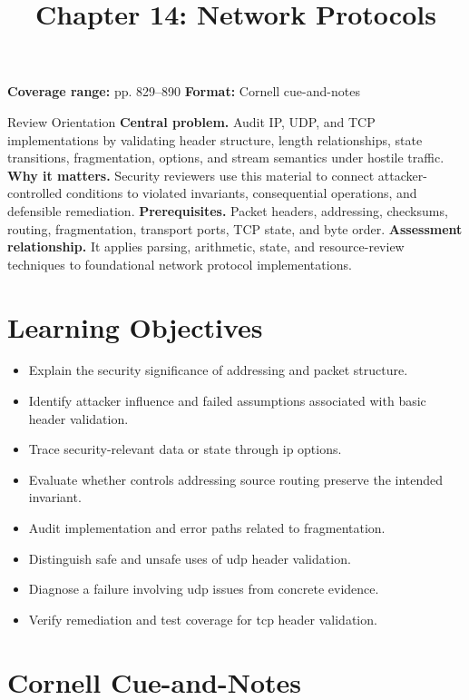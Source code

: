 \documentclass[11pt,letterpaper]{article}
\title{Chapter 14: Network Protocols}
\author{}
\date{}
\begin{document}
\maketitle

\begin{center}
\small\color{Meta}\textbf{Coverage range:} pp. 829--890 \quad\textbullet\quad \textbf{Format:} Cornell cue-and-notes
\end{center}
\vspace{0.25em}
\begin{CornellOverviewBox}{Review Orientation}
\textbf{Central problem.} Audit IP, UDP, and TCP implementations by validating header structure, length relationships, state transitions, fragmentation, options, and stream semantics under hostile traffic.
\textbf{Why it matters.} Security reviewers use this material to connect attacker-controlled conditions to violated invariants, consequential operations, and defensible remediation.
\textbf{Prerequisites.} Packet headers, addressing, checksums, routing, fragmentation, transport ports, TCP state, and byte order.
\textbf{Assessment relationship.} It applies parsing, arithmetic, state, and resource-review techniques to foundational network protocol implementations.
\end{CornellOverviewBox}
\section{Learning Objectives}
\begin{itemize}
\item Explain the security significance of addressing and packet structure.
\item Identify attacker influence and failed assumptions associated with basic header validation.
\item Trace security-relevant data or state through ip options.
\item Evaluate whether controls addressing source routing preserve the intended invariant.
\item Audit implementation and error paths related to fragmentation.
\item Distinguish safe and unsafe uses of udp header validation.
\item Diagnose a failure involving udp issues from concrete evidence.
\item Verify remediation and test coverage for tcp header validation.
\end{itemize}
\section{Cornell Cue-and-Notes}
\end{document}
